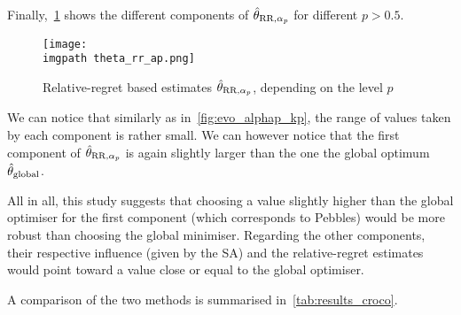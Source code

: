 \documentclass[../../Main_ManuscritThese.tex]{subfiles}
\newcommand\imgpath{/home/victor/acadwriting/Manuscrit/Text/Chapter5/img/}
\begin{document}
Finally,~\cref{fig:theta_rr_alpha} shows the different components of
$\hat{\theta}_{\mathrm{RR},\alpha_p}$ for different $p> 0.5$.
\begin{figure}[ht]
  \centering
  \texttt{[image: \\imgpath theta\_rr\_ap.png]}
  \caption{\label{fig:theta_rr_alpha} Relative-regret based estimates
    $\hat{\theta}_{\mathrm{RR}, \alpha_p}$, depending on the level $p$}
\end{figure}
We can notice that similarly as in~\cref{fig:evo_alphap_kp}, the range
of values taken by each component is rather small. We can however
notice that the first component of $\hat{\theta}_{\mathrm{RR}, \alpha_p}$
is again slightly larger than the one the global optimum
$\hat{\theta}_{\mathrm{global}}$.


All in all, this study suggests that choosing a value slightly higher
than the global optimiser for the first component (which corresponds
to Pebbles) would be more robust than choosing the global
minimiser. Regarding the other components, their respective influence
(given by the SA) and the relative-regret estimates would point toward
a value close or equal to the global optimiser.

A comparison of the two methods is summarised in~\cref{tab:results_croco}.
\end{document}
